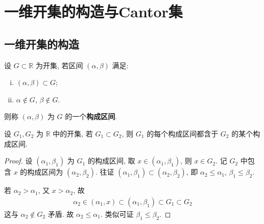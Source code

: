 \documentclass[../../main.tex]{subfiles}
\begin{document}
\section{一维开集的构造与Cantor集}

\subsection{一维开集的构造}

\begin{definition}[构成区间]
设 $G \subset \mathbb{R}$ 为开集, 若区间 $(\alpha, \beta)$ 满足:
\begin{enumerate}[(i)]
\item $(\alpha, \beta) \subset G$;
\item $\alpha \notin G$, $\beta \notin G$.
\end{enumerate}
则称 $(\alpha, \beta)$ 为 $G$ 的一个\textbf{构成区间}.
\end{definition}

\begin{proposition}
设 $G_1, G_2$ 为 $\mathbb{R}$ 中的开集, 若 $G_1 \subset G_2$, 则 $G_1$ 的每个构成区间都含于 $G_2$ 的某个构成区间.
\end{proposition}
\begin{proof}
 设 $(\alpha_1, \beta_1)$ 为 $G_1$ 的构成区间, 取 $x \in (\alpha_1, \beta_1)$, 则 $x \in G_2$. 记 $G_2$ 中包含 $x$ 的构成区间为 $(\alpha_2, \beta_2)$. 往证 $(\alpha_1, \beta_1) \subset (\alpha_2, \beta_2)$, 即 $\alpha_2 \leqslant \alpha_1$, $\beta_1 \leqslant \beta_2$.

若 $\alpha_2 > \alpha_1$, 又 $x > \alpha_2$, 故
\begin{align*}
\alpha_2 \in (\alpha_1, x) \subset (\alpha_1, \beta_1) \subset G_1 \subset G_2
\end{align*}
这与 $\alpha_2 \notin G_2$ 矛盾. 故 $\alpha_2 \leqslant \alpha_1$. 类似可证 $\beta_1 \leqslant \beta_2$.
\end{proof}
\end{document}
